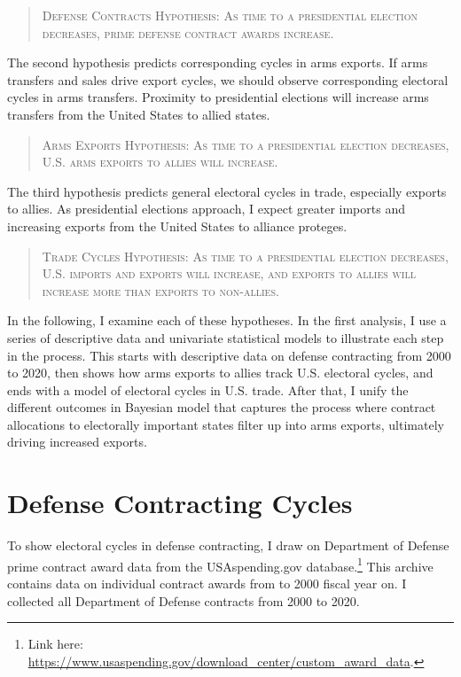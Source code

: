 \documentclass[12pt]{article}
\begin{document}
\begin{quote}
\textsc{Defense Contracts Hypothesis: As time to a presidential election decreases, prime defense contract awards increase.}
\end{quote}


The second hypothesis predicts corresponding cycles in arms exports.
If arms transfers and sales drive export cycles, we should observe corresponding electoral cycles in arms transfers.
Proximity to presidential elections will increase arms transfers from the United States to allied states. 


\begin{quote}
\textsc{Arms Exports Hypothesis: As time to a presidential election decreases, U.S. arms exports to allies will increase.}
\end{quote}


The third hypothesis predicts general electoral cycles in trade, especially exports to allies. 
As presidential elections approach, I expect greater imports and increasing exports from the United States to alliance proteges.


\begin{quote}
\textsc{Trade Cycles Hypothesis: As time to a presidential election decreases, U.S. imports and exports will increase, and exports to allies will increase more than exports to non-allies.}
\end{quote}



In the following, I examine each of these hypotheses. 
In the first analysis, I use a series of descriptive data and univariate statistical models to illustrate each step in the process.
This starts with descriptive data on defense contracting from 2000 to 2020, then shows how arms exports to allies track U.S. electoral cycles, and ends with a model of electoral cycles in U.S. trade. 
After that, I unify the different outcomes in Bayesian model that captures the process where contract allocations to electorally important states filter up into arms exports, ultimately driving increased exports.


\section{Defense Contracting Cycles}


To show electoral cycles in defense contracting, I draw on Department of Defense prime contract award data from the USAspending.gov database.\footnote{Link here: \url{https://www.usaspending.gov/download_center/custom_award_data}.} 
This archive contains data on individual contract awards from to 2000 fiscal year on.
I collected all Department of Defense contracts from 2000 to 2020.
\end{document}
